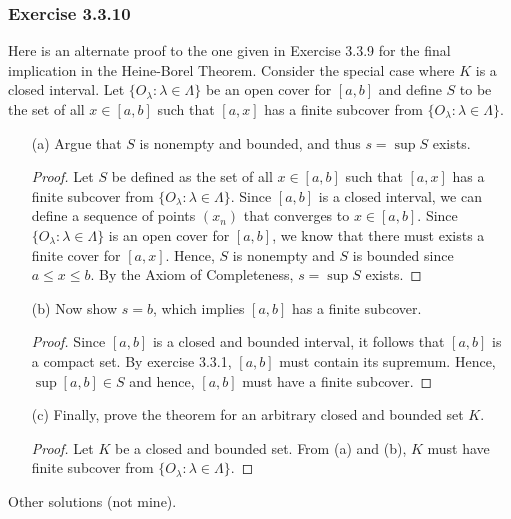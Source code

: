 \subsubsection{Exercise 3.3.10} Here is an alternate proof to the one given in Exercise 3.3.9 for the final implication in the Heine-Borel Theorem. Consider the special case where \( K \) is a closed interval. Let \( \{ O_{\lambda} : \lambda \in \Lambda\}  \) be an open cover for \( [a,b] \) and define \( S \) to be the set of all \( x \in [a,b] \) such that \( [a,x] \) has a finite subcover from \( \{ O_{\lambda} : \lambda \in \Lambda \}  \).
\begin{enumerate}
    \item[(a)] Argue that \( S \) is nonempty and bounded, and thus \( s = \sup S \) exists.
        \begin{proof}
            Let \( S \) be defined as the set of all \( x \in [a,b] \) such that \( [a,x] \) has a finite subcover from \( \{ O_{\lambda} : \lambda \in \Lambda \}  \). Since \( [a,b] \) is a closed interval, we can define a sequence of points \( (x_n) \) that converges to \( x \in [a,b] \). Since \( \{ O_{\lambda} : \lambda \in \Lambda\}  \) is an open cover for \( [a,b] \), we know that there must exists a finite cover for \( [a,x] \). Hence, \( S \) is nonempty and \( S \) is bounded since \( a \leq x \leq b \). By the Axiom of Completeness, \( s = \sup S \) exists.
        \end{proof}
    \item[(b)] Now show \( s = b  \), which implies \( [a,b] \) has a finite subcover. 
        \begin{proof}
            Since \( [a,b] \) is a closed and bounded interval, it follows that \( [a,b] \) is a compact set. By exercise 3.3.1, \( [a,b] \) must contain its supremum. Hence, \( \sup [a,b] \in S \) and hence, \( [a,b] \) must have a finite subcover.
        \end{proof}
    \item[(c)] Finally, prove the theorem for an arbitrary closed and bounded set \( K \).
        \begin{proof}
            Let \( K \) be a closed and bounded set. From (a) and (b), \( K \) must have finite subcover from \( \{ O_{\lambda} : \lambda \in \Lambda \}  \).
        \end{proof}
\end{enumerate}

Other solutions (not mine).

